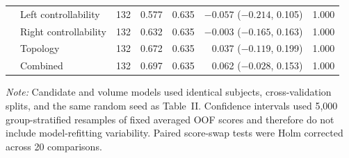 \documentclass{article}
\begin{document}
\begin{landscape}
\begin{longtable}{llrrrrr}
& Left controllability & 132 & 0.577 & 0.635 & $-0.057$ ($-0.214$, 0.105) & 1.000\\
& Right controllability & 132 & 0.632 & 0.635 & $-0.003$ ($-0.165$, 0.163) & 1.000\\
& Topology & 132 & 0.672 & 0.635 & 0.037 ($-0.119$, 0.199) & 1.000\\
& Combined & 132 & 0.697 & 0.635 & 0.062 ($-0.028$, 0.153) & 1.000\\
\bottomrule
\end{longtable}
\footnotesize\textit{Note:} Candidate and volume models used identical subjects, cross-validation splits, and the same random seed as Table~II. Confidence intervals used 5,000 group-stratified resamples of fixed averaged OOF scores and therefore do not include model-refitting variability. Paired score-swap tests were Holm corrected across 20 comparisons.
\end{landscape}
\end{document}
